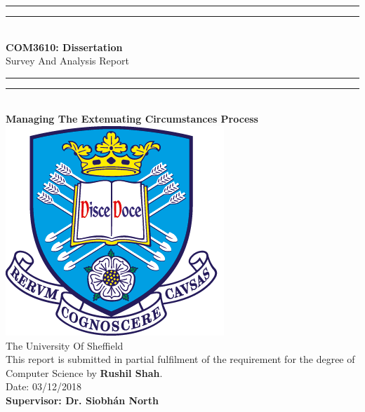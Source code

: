 \documentclass[../main.tex]{subfiles}
\begin{document}
\begin{center}
\rule[0.5ex]{\linewidth}{2pt}\vspace*{-\baselineskip}\vspace*{3.2pt}
\rule[0.5ex]{\linewidth}{1pt}\\[\baselineskip]

\textbf{ {\LARGE COM3610: Dissertation}}\\[2mm]
{\Large Survey And Analysis Report}\\[4mm]

\rule[0.5ex]{\linewidth}{1pt}\vspace*{-\baselineskip}\vspace{3.2pt}
\rule[0.5ex]{\linewidth}{2pt}\\[4mm]

\textbf{{\large Managing The Extenuating Circumstances Process}}\\[20mm]


\includegraphics[scale=2]{images/TuosLogo.png}\\[12mm]

{\LARGE The University Of Sheffield}\\[2mm]
This report is submitted in partial fulfilment of the requirement for the degree of Computer Science by \textbf{Rushil Shah}.\\[2mm]

Date: 03/12/2018\\[20mm]
{\large \textbf{Supervisor: Dr. Siobhán North}}

\end{center}





%
%
%
\end{document}
